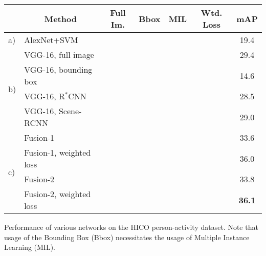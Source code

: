 \documentclass[runningheads]{llncs}
\begin{document}
	\begin{center}
		\begin{tabular}{ll|c|c|c|c|c}
			\hline
			& \multicolumn{1}{c|}{\bf Method} & {\bf Full Im.} & {\bf Bbox} & {\bf MIL} & {\bf Wtd. Loss} & {\bf mAP }	\\ \hline
			a) & AlexNet+SVM~\cite{chao2015hico}	& \checkmark & & & & 19.4						\\ \hline
			\multirow{4}{*}{b)} & VGG-16, full image	& \checkmark & & & & 29.4 \\
			& VGG-16, bounding box & & \checkmark & \checkmark &  & 14.6 \\ 
			& VGG-16, R$^\ast$CNN & & \checkmark & \checkmark & & 28.5 		\\ 
			& VGG-16, Scene-RCNN & \checkmark & \checkmark & \checkmark & & 29.0 \\ \hline
			
			\multirow{4}{*}{c)} & Fusion-1 & \checkmark & \checkmark & \checkmark & & 33.6 \\
			& Fusion-1, weighted loss & \checkmark & \checkmark & \checkmark & \checkmark & 36.0 \\

			& Fusion-2 & \checkmark & \checkmark & \checkmark & & 33.8 \\
			& Fusion-2, weighted loss & \checkmark & \checkmark & \checkmark & \checkmark & {\bf 36.1} \\ \hline
			
		\end{tabular}
	\end{center}
	\caption{Performance of various networks on the HICO person-activity dataset. Note that usage of the Bounding Box (Bbox) necessitates the usage of Multiple Instance Learning (MIL).}
	\label{table:hico_results}
\end{document}
